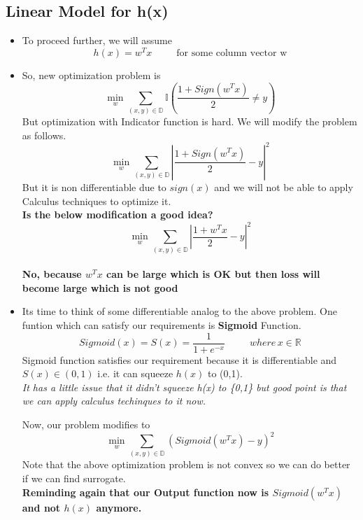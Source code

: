 \documentclass[11pt, twosides]{article}
\begin{document}
\subsection{Linear Model for h(x)}

\begin{itemize}
    \item To proceed further, we will assume 
    $$h(x)= w^{T}x \hspace{30pt} \text{for some column vector w}$$
    \item So, new optimization problem is 
     $$\min_{w} \sum_{(x,y)\in \mathbb{D}}{\mathbb{I}\left({\frac{1+Sign(w^{T}x)}{2}}\ne y\right)}$$
    But optimization with Indicator function is hard.
     We will modify the problem as follows.
     $$\min_{w} \sum_{(x,y)\in \mathbb{D}}
     {\left|{\frac{1+Sign(w^{T}x)}{2}}-y\right|^{2}}$$
     But it is non differentiable due to $sign(x)$ and we will not be able to apply Calculus techniques to optimize it.\\
     \textbf{Is the below modification a good idea?}
     $$\min_{w} \sum_{(x,y)\in \mathbb{D}}
     {\left|{\frac{1+w^{T}x}{2}}-y\right|^{2}}$$\\
     \textbf{No, because $w^{T}x$ can be large which is OK but then loss will become large which is not good}  
     
     \item Its time to think of some differentiable analog to the above problem.
    One funtion which can satisfy our requirements is \textbf{Sigmoid} Function.
    \begin{equation*}
Sigmoid(x) = S(x) =\frac{1}{1+e^{-x}}\hspace{30pt} where \hspace{2pt}x \in \mathbb{R} 
\end{equation*}
Sigmoid function satisfies our requirement because it is differentiable and $S(x) \in (0,1)$ i.e. it can squeeze $h(x)$ to (0,1).\\
\textit{It has a little issue that it didn't squeeze h(x) to \{0,1\} but good point is that we can apply calculus techinques to it now.}

 Now, our problem modifies to 
$$\min_{w} \sum_{(x,y)\in \mathbb{D}}
     {\left({Sigmoid(w^{T}x)-y}\right)^{2}}$$
Note that the above optimization problem is not convex so we can do better if we can find surrogate.\\
\textbf{Reminding again that our Output function now is ${Sigmoid(w^{T}x)}$ and not $h(x)$ anymore.}
\end{itemize}
\end{document}
